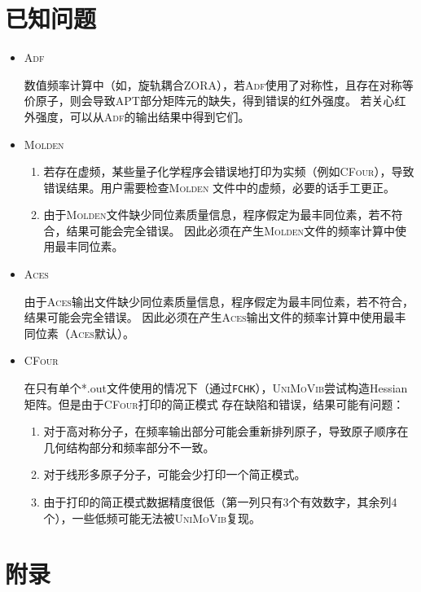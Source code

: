 \documentclass[12pt,a4paper,openany,twoside,cap,UTF8]{ctexbook}
\begin{document}
\chapter{已知问题} \label{part:problem}

\begin{itemize}
\item \textsc{Adf}

数值频率计算中（如，旋轨耦合ZORA），若\textsc{Adf}使用了对称性，且存在对称等价原子，则会导致APT部分矩阵元的缺失，得到错误的红外强度。
若关心红外强度，可以从\textsc{Adf}的输出结果中得到它们。

\item \textsc{Molden}

\begin{enumerate}
\item 若存在虚频，某些量子化学程序会错误地打印为实频（例如\textsc{CFour}），导致错误结果。用户需要检查\textsc{Molden}
文件中的虚频，必要的话手工更正。

\item 由于\textsc{Molden}文件缺少同位素质量信息，程序假定为最丰同位素，若不符合，结果可能会完全错误。
因此必须在产生\textsc{Molden}文件的频率计算中使用最丰同位素。
\end{enumerate}

\item \textsc{Aces}

由于\textsc{Aces}输出文件缺少同位素质量信息，程序假定为最丰同位素，若不符合，结果可能会完全错误。
因此必须在产生\textsc{Aces}输出文件的频率计算中使用最丰同位素（\textsc{Aces}默认）。

\item \textsc{CFour}

在只有单个*.out文件使用的情况下（通过\verb|FCHK|），\textsc{UniMoVib}尝试构造Hessian矩阵。但是由于\textsc{CFour}打印的简正模式
存在缺陷和错误，结果可能有问题：
\begin{enumerate}
  \item 对于高对称分子，在频率输出部分可能会重新排列原子，导致原子顺序在几何结构部分和频率部分不一致。
  \item 对于线形多原子分子，可能会少打印一个简正模式。
  \item 由于打印的简正模式数据精度很低（第一列只有3个有效数字，其余列4个），一些低频可能无法被\textsc{UniMoVib}复现。
\end{enumerate}

\end{itemize}

\appendix
\chapter{附录} \label{part:appdx}
\end{document}
